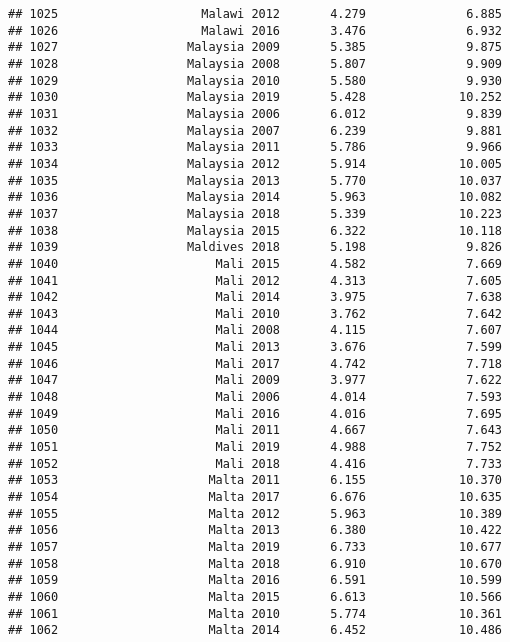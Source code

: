 \documentclass[
]{article}
\begin{document}
\begin{verbatim}
## 1025                    Malawi 2012       4.279              6.885
## 1026                    Malawi 2016       3.476              6.932
## 1027                  Malaysia 2009       5.385              9.875
## 1028                  Malaysia 2008       5.807              9.909
## 1029                  Malaysia 2010       5.580              9.930
## 1030                  Malaysia 2019       5.428             10.252
## 1031                  Malaysia 2006       6.012              9.839
## 1032                  Malaysia 2007       6.239              9.881
## 1033                  Malaysia 2011       5.786              9.966
## 1034                  Malaysia 2012       5.914             10.005
## 1035                  Malaysia 2013       5.770             10.037
## 1036                  Malaysia 2014       5.963             10.082
## 1037                  Malaysia 2018       5.339             10.223
## 1038                  Malaysia 2015       6.322             10.118
## 1039                  Maldives 2018       5.198              9.826
## 1040                      Mali 2015       4.582              7.669
## 1041                      Mali 2012       4.313              7.605
## 1042                      Mali 2014       3.975              7.638
## 1043                      Mali 2010       3.762              7.642
## 1044                      Mali 2008       4.115              7.607
## 1045                      Mali 2013       3.676              7.599
## 1046                      Mali 2017       4.742              7.718
## 1047                      Mali 2009       3.977              7.622
## 1048                      Mali 2006       4.014              7.593
## 1049                      Mali 2016       4.016              7.695
## 1050                      Mali 2011       4.667              7.643
## 1051                      Mali 2019       4.988              7.752
## 1052                      Mali 2018       4.416              7.733
## 1053                     Malta 2011       6.155             10.370
## 1054                     Malta 2017       6.676             10.635
## 1055                     Malta 2012       5.963             10.389
## 1056                     Malta 2013       6.380             10.422
## 1057                     Malta 2019       6.733             10.677
## 1058                     Malta 2018       6.910             10.670
## 1059                     Malta 2016       6.591             10.599
## 1060                     Malta 2015       6.613             10.566
## 1061                     Malta 2010       5.774             10.361
## 1062                     Malta 2014       6.452             10.486

\end{verbatim}
\end{document}
